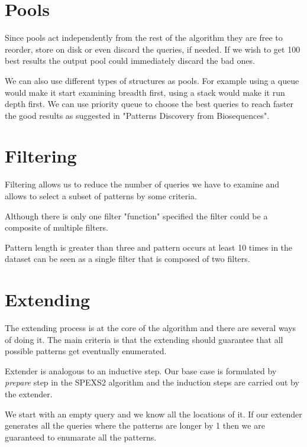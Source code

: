 \section{Pools}

Since pools act independently from the rest of the algorithm they are free to reorder, store on disk or even discard the queries, if needed. If we wish to get 100 best results the output pool could immediately discard the bad ones.

We can also use different types of structures as pools. For example using a queue would make it start examining breadth first, using a stack would make it run depth first. We can use priority queue to choose the best queries to reach faster the good results as suggested in "Patterns Discovery from Biosequences"\cite{spexs}.

\section{Filtering}

Filtering allows us to reduce the number of queries we have to examine and allows to select a subset of patterns by some criteria. \eg

Although there is only one filter "function" specified the filter could be a composite of multiple filters.

\begin{exmp}
Pattern length is greater than three and pattern occurs at least 10 times in the dataset can be seen as a single filter that is composed of two filters.
\end{exmp}

\section{Extending}

The extending process is at the core of the algorithm and there are several ways of doing it. The main criteria is that the extending should guarantee that all possible patterns get eventually enumerated.

Extender is analogous to an inductive step. Our base case is formulated by \emph{prepare} step in the SPEXS2 algorithm and the induction steps are carried out by the extender.

\begin{exmp}
We start with an empty query and we know all the locations of it. If our extender generates all the queries where the patterns are longer by 1 then we are guaranteed to enumarate all the patterns.
\end{exmp}

